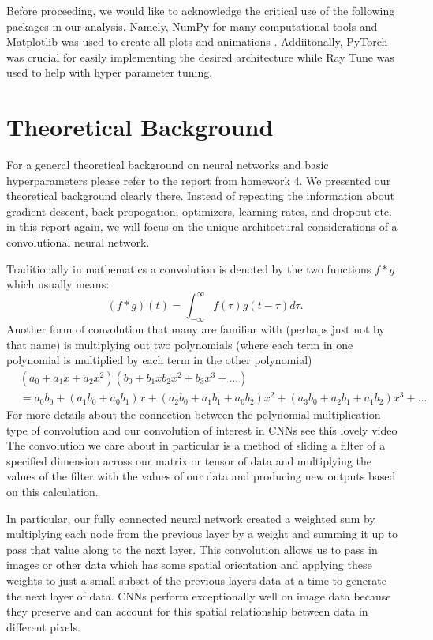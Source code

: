 \documentclass[11pt]{amsart}
\begin{document}
Before proceeding, we would like to acknowledge the critical use of the following packages in our analysis.
Namely, NumPy for many computational tools \cite{harris2020array} and Matplotlib was used to create all plots and animations \cite{Hunter:2007}.
Addiitonally, PyTorch \cite{Ansel_PyTorch_2_Faster_2024} was crucial for easily implementing the desired architecture while Ray Tune \cite{liaw2018tune} was used to help with hyper parameter tuning.

\section{Theoretical Background}\label{sec:theory}
For a general theoretical background on neural networks and basic hyperparameters please refer to the report from homework 4.
We presented our theoretical background clearly there.
Instead of repeating the information about gradient descent, back propogation, optimizers, learning rates, and dropout etc. in this report again, we will focus on the unique architectural considerations of a convolutional neural network.

Traditionally in mathematics a convolution is denoted by the two functions $f * g$ which usually means:
$$(f*g)(t) = \int_{-\infty}^\infty f(\tau) g(t - \tau) d \tau.$$
Another form of convolution that many are familiar with (perhaps just not by that name) is multiplying out two polynomials (where each term in one polynomial is multiplied by each term in the other polynomial)
\begin{align*}
& (a_0 + a_1x + a_2x^2) (b_0 + b_1x b_2x^2 + b_3x^3 + ...) \\
&= a_0b_0 + (a_1b_0 + a_0b_1)x + (a_2b_0 + a_1b_1 + a_0b_2)x^2 + (a_3b_0 + a_2b_1 + a_1b_2)x^3 + ...
\end{align*}
For more details about the connection between the polynomial multiplication type of convolution and our convolution of interest in CNNs see this lovely video \cite{youtube_video}
The convolution we care about in particular is a method of sliding a filter of a specified dimension across our matrix or tensor of data and multiplying the values of the filter with the values of our data and producing new outputs based on this calculation.

In particular, our fully connected neural network created a weighted sum by multiplying each node from the previous layer by a weight and summing it up to pass that value along to the next layer.
This convolution allows us to pass in images or other data which has some spatial orientation and applying these weights to just a small subset of the previous layers data at a time to generate the next layer of data.
CNNs perform exceptionally well on image data because they preserve and can account for this spatial relationship between data in different pixels.
\end{document}

